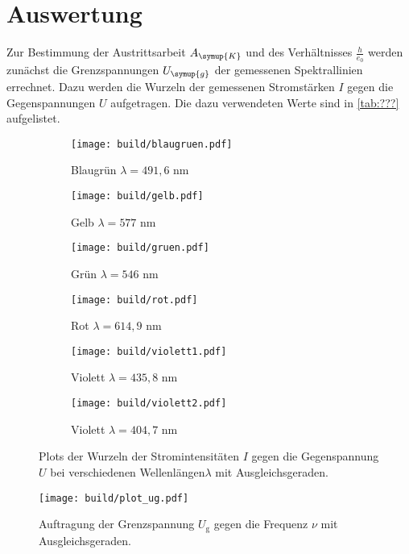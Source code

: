 \section{Auswertung}
\label{sec:Auswertung}
Zur Bestimmung der Austrittsarbeit $A_{\symup{K}}$ und des Verhältnisses $\frac{h}{e_0}$ werden zunächst die Grenzspannungen $U_{\symup{g}}$
der gemessenen Spektrallinien errechnet. Dazu werden die Wurzeln der gemessenen Stromstärken $I$ gegen die Gegenspannungen $U$ aufgetragen.
Die dazu verwendeten Werte sind in \autoref{tab:???} aufgelistet. 
\begin{figure}
  \centering
  \begin{subfigure}{0.49\textwidth}
    \centering
    \texttt{[image: build/blaugruen.pdf]}
    \caption{Blaugrün $\lambda = 491,6$ nm}
  \end{subfigure}
  \begin{subfigure}{0.49\textwidth}
    \centering
    \texttt{[image: build/gelb.pdf]}
    \caption{Gelb $\lambda = 577$ nm}
  \end{subfigure}

  \begin{subfigure}{0.49\textwidth}
    \centering
    \texttt{[image: build/gruen.pdf]}
    \caption{Grün $\lambda = 546$ nm}
  \end{subfigure}
  \begin{subfigure}{0.49\textwidth}
    \centering
    \texttt{[image: build/rot.pdf]}
    \caption{Rot $\lambda = 614,9$ nm}
  \end{subfigure}

  \begin{subfigure}{0.49\textwidth}
    \centering
    \texttt{[image: build/violett1.pdf]}
    \caption{Violett $\lambda = 435,8$ nm}
  \end{subfigure}
  \begin{subfigure}{0.49\textwidth}
    \centering
    \texttt{[image: build/violett2.pdf]}
    \caption{Violett $\lambda = 404,7$ nm}
  \end{subfigure}
  \caption{Plots der Wurzeln der Stromintensitäten $I$ gegen die Gegenspannung $U$ bei verschiedenen Wellenlängen$\lambda$ mit Ausgleichsgeraden.}
  \label{fig:farben}
\end{figure}


\begin{figure}
    \centering
    \texttt{[image: build/plot\_ug.pdf]}
    \caption{Auftragung der Grenzspannung $U_\text{g}$ gegen die Frequenz $\nu$ mit Ausgleichsgeraden.}
    \label{fig:Grenzspannung}
\end{figure}    